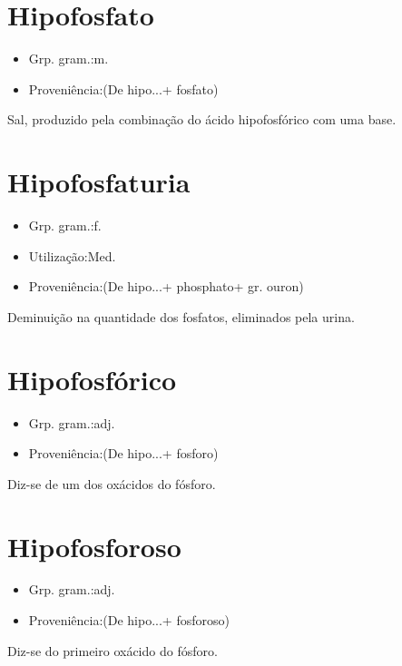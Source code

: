 \documentclass{article}
\begin{document}
\section{Hipofosfato}
\begin{itemize}
\item {Grp. gram.:m.}
\end{itemize}
\begin{itemize}
\item {Proveniência:(De \textunderscore hipo...\textunderscore  + \textunderscore fosfato\textunderscore )}
\end{itemize}
Sal, produzido pela combinação do ácido hipofosfórico com uma base.
\section{Hipofosfaturia}
\begin{itemize}
\item {Grp. gram.:f.}
\end{itemize}
\begin{itemize}
\item {Utilização:Med.}
\end{itemize}
\begin{itemize}
\item {Proveniência:(De \textunderscore hipo...\textunderscore  + \textunderscore phosphato\textunderscore  + gr. \textunderscore ouron\textunderscore )}
\end{itemize}
Deminuição na quantidade dos fosfatos, eliminados pela urina.
\section{Hipofosfórico}
\begin{itemize}
\item {Grp. gram.:adj.}
\end{itemize}
\begin{itemize}
\item {Proveniência:(De \textunderscore hipo...\textunderscore  + \textunderscore fosforo\textunderscore )}
\end{itemize}
Diz-se de um dos oxácidos do fósforo.
\section{Hipofosforoso}
\begin{itemize}
\item {Grp. gram.:adj.}
\end{itemize}
\begin{itemize}
\item {Proveniência:(De \textunderscore hipo...\textunderscore  + \textunderscore fosforoso\textunderscore )}
\end{itemize}
Diz-se do primeiro oxácido do fósforo.
\end{document}
